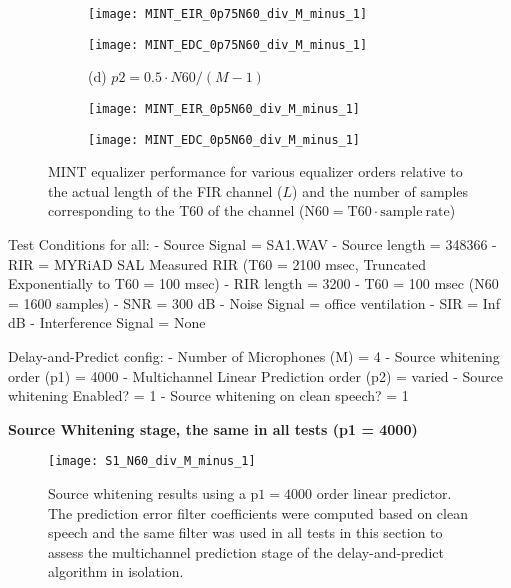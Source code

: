 \begin{figure}[H]
\begin{subfigure}[c]{0.2\textwidth}
\begin{minipage}[c][0.3\textwidth][c]{\linewidth}
		\end{minipage}
	\end{subfigure}
	\begin{subfigure}[b]{0.3\textwidth}
		\centering
		\texttt{[image: MINT\_EIR\_0p75N60\_div\_M\_minus\_1]}
	\end{subfigure}
	\begin{subfigure}[b]{0.3\textwidth}
		\centering
		\texttt{[image: MINT\_EDC\_0p75N60\_div\_M\_minus\_1]}
	\end{subfigure}
	\begin{subfigure}[c]{0.2\textwidth}
		\centering
		\begin{minipage}[c][0.3\textwidth][c]{\linewidth} %
			\centering
			(d) \newline $p2 = 0.5 \cdot N60 / (M-1)$
		\end{minipage}
	\end{subfigure}
   \begin{subfigure}[b]{0.3\textwidth}
		\centering
		\texttt{[image: MINT\_EIR\_0p5N60\_div\_M\_minus\_1]}
	\end{subfigure}
	\begin{subfigure}[b]{0.3\textwidth}
		\centering
		\texttt{[image: MINT\_EDC\_0p5N60\_div\_M\_minus\_1]}
	\end{subfigure}
	\caption{MINT equalizer performance for various equalizer orders relative to the actual length of the FIR channel ($L$) and the number of samples corresponding to the T60 of the channel ($\mathrm{N60} = \mathrm{T60}  \cdot \mathrm{sample\ rate}$)}
	\label{fig:params_p2_MINT_compare}
\end{figure}

Test Conditions for all:
- Source Signal = SA1.WAV
- Source length = 348366
- RIR = MYRiAD SAL Measured RIR (T60 = 2100 msec, Truncated Exponentially to T60 = 100 msec)
- RIR length = 3200
- T60 = 100 msec (N60 = 1600 samples)
- SNR = 300 dB
- Noise Signal = office ventilation
- SIR = Inf dB
- Interference Signal = None

Delay-and-Predict config:
- Number of Microphones (M) = 4
- Source whitening order (p1) = 4000
- Multichannel Linear Prediction order (p2) = varied
- Source whitening Enabled? = 1
- Source whitening on clean speech? = 1

\textbf{Source Whitening stage, the same in all tests (p1 = 4000)}

\begin{figure}[H]
	\texttt{[image: S1\_N60\_div\_M\_minus\_1]}
	\centering
	\caption{Source whitening results using a $\mathrm{p1} = 4000$ order linear predictor. The prediction error filter coefficients were computed based on clean speech and the same filter was used in all tests in this section to assess the multichannel prediction stage of the delay-and-predict algorithm in isolation.}
	\label{fig:params_p2_stage1}
\end{figure}

